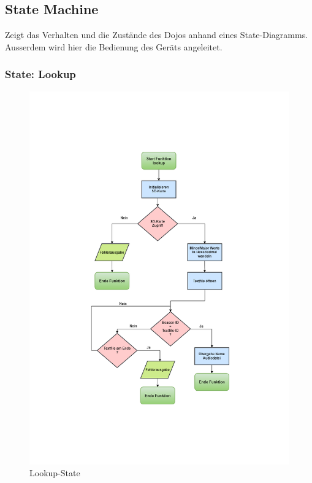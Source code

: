 \subsection{State Machine}\label{sec:stateMachine}

Zeigt das Verhalten und die Zustände des Dojos anhand eines State-Diagramms. Ausserdem wird hier die Bedienung des Geräts angeleitet. 

\subsubsection*{State: Lookup}

\begin{figure}[htbp]
	\centering
	\includegraphics[width=1.2\textwidth]{Data/lookup_picture}
	\caption[Statemachine: lookup]{Lookup-State}
	\label{fig:lookupState}
\end{figure} 